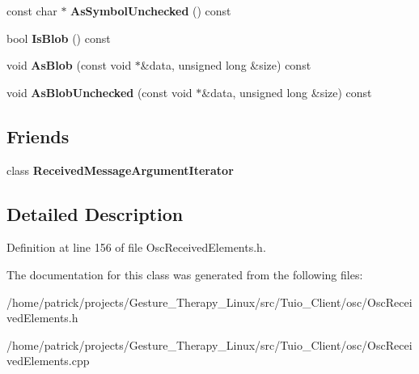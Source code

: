 \begin{DoxyCompactItemize}
const char $\ast$ {\bfseries As\+Symbol\+Unchecked} () const
\item 
\mbox{\label{classosc_1_1_received_message_argument_a966325e14e6053d87d2c75d8d4c6e655}} 
bool {\bfseries Is\+Blob} () const
\item 
\mbox{\label{classosc_1_1_received_message_argument_a73643fcdb01b419d101b312176602fd5}} 
void {\bfseries As\+Blob} (const void $\ast$\&data, unsigned long \&size) const
\item 
\mbox{\label{classosc_1_1_received_message_argument_a352155fc97f662e238c0a316d458dac7}} 
void {\bfseries As\+Blob\+Unchecked} (const void $\ast$\&data, unsigned long \&size) const
\end{DoxyCompactItemize}
\subsection*{Friends}
\begin{DoxyCompactItemize}
\item 
\mbox{\label{classosc_1_1_received_message_argument_a82c457aa107de558aadea77ed5f3a4ed}} 
class {\bfseries Received\+Message\+Argument\+Iterator}
\end{DoxyCompactItemize}


\subsection{Detailed Description}


Definition at line 156 of file Osc\+Received\+Elements.\+h.



The documentation for this class was generated from the following files\+:\begin{DoxyCompactItemize}
\item 
/home/patrick/projects/\+Gesture\+\_\+\+Therapy\+\_\+\+Linux/src/\+Tuio\+\_\+\+Client/osc/Osc\+Received\+Elements.\+h\item 
/home/patrick/projects/\+Gesture\+\_\+\+Therapy\+\_\+\+Linux/src/\+Tuio\+\_\+\+Client/osc/Osc\+Received\+Elements.\+cpp\end{DoxyCompactItemize}
